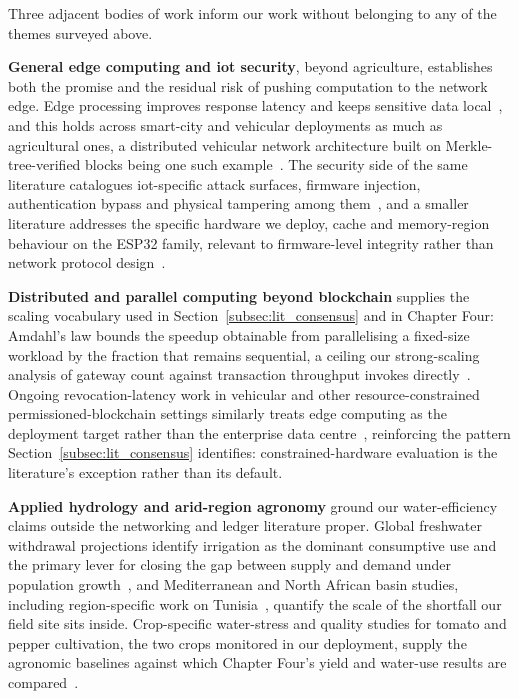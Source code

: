 \documentclass[12pt,a4paper,oneside]{book}
\begin{document}
Three adjacent bodies of work inform our work without belonging to any
of the themes surveyed above.

\textbf{General edge computing and \gls{iot} security}, beyond agriculture,
establishes both the promise and the residual risk of pushing computation
to the network edge. Edge processing improves response latency and keeps
sensitive data local~\cite{sharma2020edge, liu2019edge, wang2021edge}, and
this holds across smart-city and vehicular deployments as much as
agricultural ones, a distributed vehicular network architecture built on
Merkle-tree-verified blocks being one such
example~\cite{sharma2018merkle}. The security side of the same literature
catalogues \gls{iot}-specific attack surfaces, firmware injection,
authentication bypass and physical tampering among
them~\cite{hassan2019iotSecurity, dorri2017blockchain, kalaimathi2025injection, akande2018iotChallenges, knight2025iotResilience, bashir2023IoTWear}, and a smaller literature addresses the specific
hardware we deploy, cache and memory-region behaviour on the
ESP32 family, relevant to firmware-level integrity rather than network
protocol design~\cite{kumari2025rom, csdn_esp32s3_cache, esp_hal_cache}.

\textbf{Distributed and parallel computing beyond blockchain} supplies the
scaling vocabulary used in Section~\ref{subsec:lit_consensus} and in
Chapter Four: Amdahl's law bounds the speedup obtainable from
parallelising a fixed-size workload by the fraction that remains
sequential, a ceiling our strong-scaling analysis of gateway
count against transaction throughput invokes
directly~\cite{amdahl1967validity}. Ongoing revocation-latency work in
vehicular and other resource-constrained permissioned-blockchain settings
similarly treats edge computing as the deployment target rather than the
enterprise data centre~\cite{lu2022revocation}, reinforcing the pattern
Section~\ref{subsec:lit_consensus} identifies: constrained-hardware
evaluation is the literature's exception rather than its default.

\textbf{Applied hydrology and arid-region agronomy} ground our
water-efficiency claims outside the networking and ledger literature
proper. Global freshwater withdrawal projections identify irrigation as
the dominant consumptive use and the primary lever for closing the gap
between supply and demand under
population growth~\cite{fao2050, un_water2023}, and Mediterranean and North
African basin studies, including region-specific work on
Tunisia~\cite{tunisia_water_report, adeloye2021tunisiaAgro, benali2024tunisiaWater}, quantify the scale of the
shortfall our field site sits inside. Crop-specific water-stress
and quality studies for tomato and pepper cultivation, the two crops
monitored in our deployment, supply the agronomic baselines
against which Chapter Four's yield and water-use results are
compared~\cite{mdpi_tunisia_tomato, jaeid_pepper, fao_tomato_guide, safeer2024tomato, wang2025pepper, tia2020waterstress, pepper2021moisturecontrol, capsicumspacing2017study, precision2020yield, pepperquality2019irrigation}.
\end{document}
